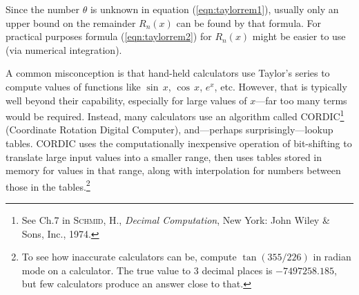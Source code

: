 Since the number $\theta$ is unknown in equation (\ref{eqn:taylorrem1}),
usually only an upper bound on the remainder $R_n(x)$ can be found by that
formula. For practical purposes formula (\ref{eqn:taylorrem2}) for $R_n(x)$
might be easier to use (via numerical integration).

A common misconception is that hand-held calculators use Taylor's series to
compute values of functions like $\sin\,x$, $\cos\,x$, $e^x$, etc. However, that
is typically well beyond their capability, especially for large values of
$x$---far too
many terms would be required. Instead, many calculators use an algorithm called
CORDIC\footnote{See Ch.7 in \textsc{Schmid, H.}, \emph{Decimal Computation},
New York: John Wiley \& Sons, Inc., 1974.}
(Coordinate Rotation Digital Computer), and---perhaps
surprisingly---lookup tables. CORDIC uses the computationally
inexpensive operation of bit-shifting to translate large input values into a
smaller range, then uses tables stored in memory for values in that range, along
with interpolation for numbers between those in the tables.\footnote{To see how
inaccurate calculators can be, compute $\tan (355/226)$ in radian mode on a
calculator. The true value to 3 decimal places is $-7497258.185$, but few
calculators produce an answer close to that.}

